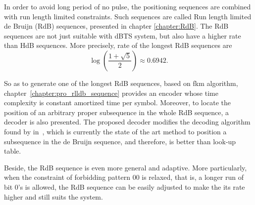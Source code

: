 In order to avoid long period of no pulse, the positioning sequences are combined with run length limited constraints. Such sequences are called Run length limited de Bruijn (RdB) sequences, presented in chapter \ref{chapter:RdB}. The \gls{RdB} sequences are not just suitable with \gls{dBTS} system, but also have a higher rate than \gls{HdB} sequences. More precisely, rate of the longest \gls{RdB} sequences are \[\log\left(\dfrac{1+\sqrt{5}}{2}\right)\approx0.6942.\]

So as to generate one of the longest \gls{RdB} sequences, based on \gls{fkm} algorithm, chapter~\ref{chapter:pro_rlldb_sequence} provides an encoder whose time complexity is constant amortized time per symbol. Moreover, to locate the position of an arbitrary proper subsequence in the whole \gls{RdB} sequence, a decoder is also presented. The proposed decoder modifies the decoding algorithm found by \citeauthor{kociumaka2016efficient} in~\cite{kociumaka2016efficient}, which is currently the state of the art method to position a subsequence in the de Bruijn sequence, and therefore, is better than look-up table.

Beside, the \gls{RdB} sequence is even more general and adaptive. More particularly, when the constraint of forbidding pattern $00$ is relaxed, that is, a longer run of bit $0$'s is allowed, the \gls{RdB} sequence can be easily adjusted to make the its rate higher and still suits the system. 